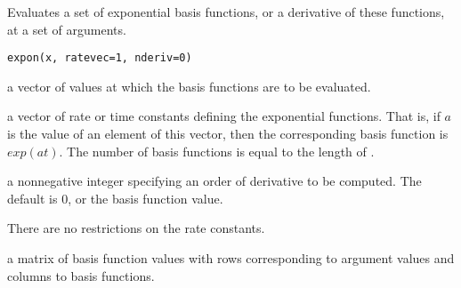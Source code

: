 \begin{Description}\relax
Evaluates a set of exponential basis functions, or a derivative of these
functions, at a set of arguments.
\end{Description}
\begin{Usage}
\begin{verbatim}
expon(x, ratevec=1, nderiv=0)
\end{verbatim}
\end{Usage}
\begin{Arguments}
\begin{ldescription}
\item[\code{x}] a vector of values at which the basis functions are to be evaluated.

\item[\code{ratevec}] a vector of rate or time constants defining the exponential
functions.  That is, if $a$ is the value of an
element of this vector, then the corresponding basis function
is $exp(at)$. The number of basis functions is equal
to the length of .

\item[\code{nderiv}] a nonnegative integer specifying an order of derivative to
be computed.  The default is 0, or the basis function value.

\end{ldescription}
\end{Arguments}
\begin{Details}\relax
There are no restrictions on the rate constants.
\end{Details}
\begin{Value}
a matrix of basis function values with rows corresponding
to argument values and columns to basis functions.
\end{Value}
\begin{SeeAlso}\relax
{}
\end{SeeAlso}

